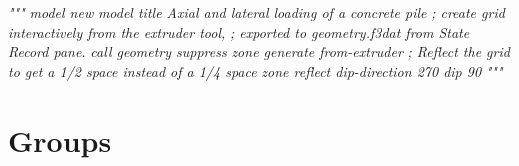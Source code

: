 \documentclass[a4paper, nobind]{templates/ociamthesis}
\newenvironment{Shaded}{\begin{snugshade}}{\end{snugshade}}
\newcommand{\CommentTok}[1]{\textcolor[rgb]{0.56,0.35,0.01}{\textit{#1}}}
\renewenvironment{Shaded}
{
  \vspace{10pt}%
  \begin{snugshade}%
}{%
  \end{snugshade}%
  \vspace{8pt}%
}
\begin{document}
\begin{Shaded}
\begin{Highlighting}[]
\CommentTok{"""}
\CommentTok{model new}
\CommentTok{model title \textquotesingle{}Axial and lateral loading of a concrete pile\textquotesingle{}}
\CommentTok{; create grid interactively from the extruder tool, }
\CommentTok{; exported to geometry.f3dat from State Record pane.}
\CommentTok{call \textquotesingle{}geometry\textquotesingle{} suppress}
\CommentTok{zone generate from{-}extruder}
\CommentTok{; Reflect the grid to get a 1/2 space instead of a 1/4 space}
\CommentTok{zone reflect dip{-}direction 270 dip 90}
\CommentTok{"""}
\end{Highlighting}
\end{Shaded}

\hypertarget{groups-1}{%
\section{Groups}\label{groups-1}}
\end{document}

